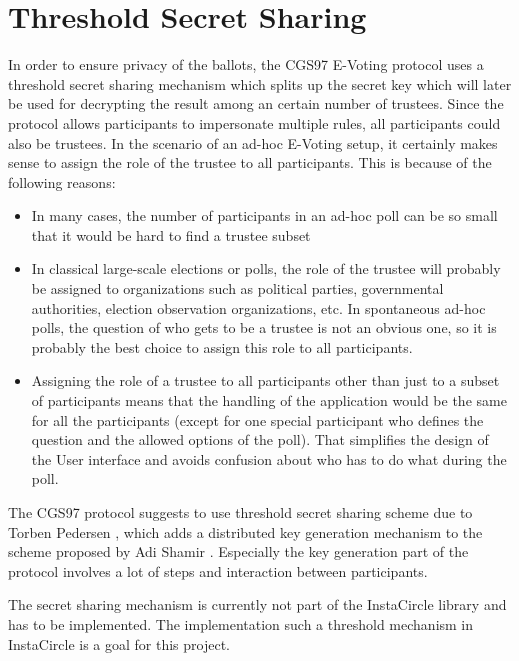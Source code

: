 \documentclass[numbers=noenddot, abstract=on]{scrreprt}
\begin{document}
\section{Threshold Secret Sharing}
\label{sec:thresholdsecretsharing}
In order to ensure privacy of the ballots, the CGS97 \cite{CGS97} E-Voting
protocol uses a threshold secret sharing mechanism which splits up the secret
key which will later be used for decrypting the result among an certain number
of trustees. Since the protocol allows participants to impersonate multiple
rules, all participants could also be trustees. In the scenario of an ad-hoc
E-Voting setup, it certainly makes sense to assign the role of the trustee to
all participants. This is because of the following reasons:
\begin{itemize}
  \item In many cases, the number of participants in an ad-hoc poll can be so
  small that it would be hard to find a trustee subset
  \item In classical large-scale elections or polls, the role of the trustee
  will probably be assigned to organizations such as political parties,
  governmental authorities, election observation organizations, etc. In
  spontaneous ad-hoc polls, the question of who gets to be a trustee is not an
  obvious one, so it is probably the best choice to assign this role to all
  participants.
  \item Assigning the role of a trustee to all participants other than just to a
  subset of participants means that the handling of the application would be the
  same for all the participants (except for one special participant who defines
  the question and the allowed options of the poll). That simplifies the design
  of the User interface and avoids confusion about who has to do what during the
  poll.
\end{itemize}

The CGS97 protocol suggests to use threshold secret sharing scheme due to Torben
Pedersen \cite{PED91}, which adds a distributed key generation mechanism to the
scheme proposed by Adi Shamir \cite{SHA79}. Especially the key generation part
of the protocol involves a lot of steps and interaction between participants.

The secret sharing mechanism is currently not part of the InstaCircle library
and has to be implemented. The implementation such a threshold mechanism in
InstaCircle is a goal for this project.
\end{document}
